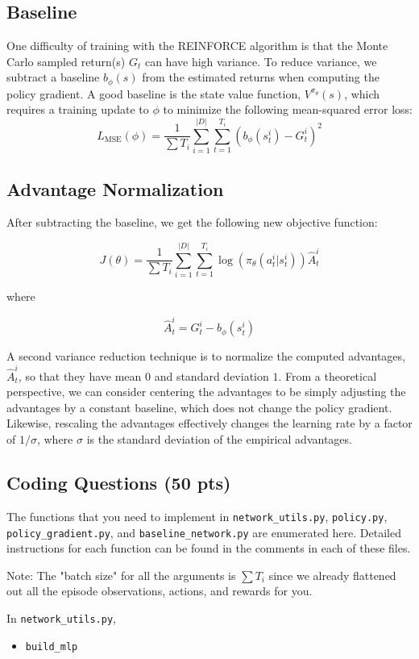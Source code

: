 \documentclass{article}
\begin{document}
\subsection{Baseline}
One difficulty of training with the REINFORCE algorithm is that the Monte Carlo sampled return(s) $G_t$ can have high variance. To reduce variance, we subtract a baseline $b_{\phi}(s)$ from the estimated returns when computing the policy gradient. A good baseline is the state value function, $V^{\pi_\theta}(s)$, which requires a training update to $\phi$ to minimize the following mean-squared error loss:
\[ L_{\text{MSE}}(\phi) = \frac{1}{\sum T_i} \sum_{i=1}^{|D|} \sum_{t=1}^{T_i} (b_{\phi}(s^i_t) - G^i_t)^2\]
\subsection{Advantage Normalization}

After subtracting the baseline, we get the following new objective function:

\[ J(\theta) = \frac{1}{\sum T_i} \sum_{i=1}^{|D|} \sum_{t=1}^{T_i} \log(\pi_\theta(a^i_t|s^i_t)) \hat{A}^i_t \]

where

\[\hat{A}^i_t = G^i_t - b_{\phi}(s^i_t)\]

A second variance reduction technique is to normalize the computed advantages, $\hat{A}^i_t$, so that they have mean $0$ and standard deviation $1$. From a theoretical perspective, we can consider centering the advantages to be simply adjusting the advantages by a constant baseline, which does not change the policy gradient. Likewise, rescaling the advantages effectively changes the learning rate by a factor of $1/\sigma$, where $\sigma$ is the standard deviation of the empirical advantages.

\subsection{Coding Questions (50 pts)}
The functions that you need to implement in \texttt{network\_utils.py}, \texttt{policy.py}, \texttt{policy\_gradient.py}, and \texttt{baseline\_network.py} are enumerated here. Detailed instructions for each function can be found in the comments in each of these files.

Note: The "batch size" for all the arguments is $\sum T_i$ since we already flattened out all the episode observations, actions, and rewards for you.

In \texttt{network\_utils.py},
\begin{itemize}
\item \texttt{build\_mlp}
\end{itemize}
\end{document}
